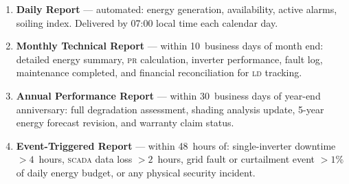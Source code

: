 \begin{enumerate}[leftmargin=1.6em, itemsep=4pt]
  \item \textbf{Daily Report} — automated: energy generation, availability, active alarms,
        soiling index. Delivered by 07:00 local time each calendar day.

  \item \textbf{Monthly Technical Report} — within 10~business days of month end: detailed
        energy summary, \textsc{pr} calculation, inverter performance, fault log, maintenance
        completed, and financial reconciliation for \textsc{ld} tracking.

  \item \textbf{Annual Performance Report} — within 30~business days of year-end anniversary:
        full degradation assessment, shading analysis update, 5-year energy forecast revision,
        and warranty claim status.

  \item \textbf{Event-Triggered Report} — within 48~hours of: single-inverter downtime
        $>4$~hours, \textsc{scada} data loss $>2$~hours, grid fault or curtailment event
        $>1\%$ of daily energy budget, or any physical security incident.
\end{enumerate}

